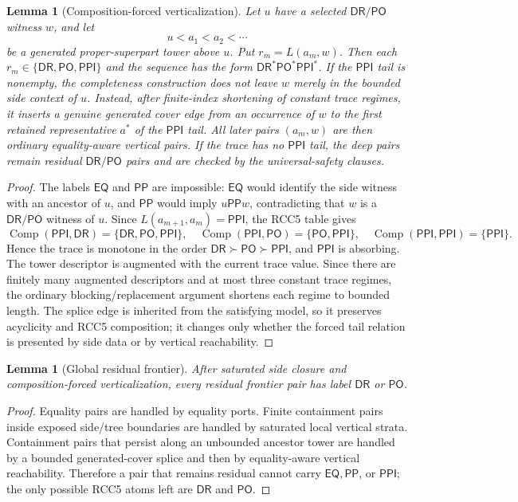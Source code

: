 \documentclass[11pt]{article}
\newtheorem{lemma}[theorem]{Lemma}
\newcommand{\EQ}{\mathsf{EQ}}
\newcommand{\PP}{\mathsf{PP}}
\newcommand{\PPI}{\mathsf{PPI}}
\newcommand{\PO}{\mathsf{PO}}
\newcommand{\DR}{\mathsf{DR}}
\newcommand{\comp}{\operatorname{Comp}}
\begin{document}
\begin{lemma}[Composition-forced verticalization]\label{lem:forced-verticalization-compact}
Let \(u\) have a selected \(\DR/\PO\) witness \(w\), and let
\[
   u<a_1<a_2<\cdots
\]
be a generated proper-superpart tower above \(u\).  Put \(r_m=L(a_m,w)\).  Then each \(r_m\in\{\DR,\PO,\PPI\}\) and the sequence has the form \(\DR^*\PO^*\PPI^*\).  If the \(\PPI\) tail is nonempty, the completeness construction does not leave \(w\) merely in the bounded side context of \(u\).  Instead, after finite-index shortening of constant trace regimes, it inserts a genuine generated cover edge from an occurrence of \(w\) to the first retained representative \(a^*\) of the \(\PPI\) tail.  All later pairs \((a_m,w)\) are then ordinary equality-aware vertical pairs.  If the trace has no \(\PPI\) tail, the deep pairs remain residual \(\DR/\PO\) pairs and are checked by the universal-safety clauses.
\end{lemma}

\begin{proof}
The labels \(\EQ\) and \(\PP\) are impossible: \(\EQ\) would identify the side witness with an ancestor of \(u\), and \(\PP\) would imply \(u\PP w\), contradicting that \(w\) is a \(\DR/\PO\) witness of \(u\).  Since \(L(a_{m+1},a_m)=\PPI\), the RCC5 table gives
\[
\comp(\PPI,\DR)=\{\DR,\PO,\PPI\},\quad
\comp(\PPI,\PO)=\{\PO,\PPI\},\quad
\comp(\PPI,\PPI)=\{\PPI\}.
\]
Hence the trace is monotone in the order \(\DR\succ\PO\succ\PPI\), and \(\PPI\) is absorbing.  The tower descriptor is augmented with the current trace value.  Since there are finitely many augmented descriptors and at most three constant trace regimes, the ordinary blocking/replacement argument shortens each regime to bounded length.  The splice edge is inherited from the satisfying model, so it preserves acyclicity and RCC5 composition; it changes only whether the forced tail relation is presented by side data or by vertical reachability.
\end{proof}

\begin{lemma}[Global residual frontier]\label{lem:global-residual-frontier-compact}
After saturated side closure and composition-forced verticalization, every residual frontier pair has label \(\DR\) or \(\PO\).
\end{lemma}

\begin{proof}
Equality pairs are handled by equality ports.  Finite containment pairs inside exposed side/tree boundaries are handled by saturated local vertical strata.  Containment pairs that persist along an unbounded ancestor tower are handled by a bounded generated-cover splice and then by equality-aware vertical reachability.  Therefore a pair that remains residual cannot carry \(\EQ,\PP\), or \(\PPI\); the only possible RCC5 atoms left are \(\DR\) and \(\PO\).
\end{proof}
\end{document}
